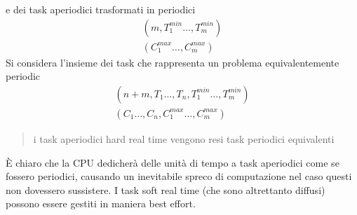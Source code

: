 \documentclass[10pt, letterpaper]{report}
\begin{document}
e dei task aperiodici trasformati in periodici
$$ \begin{matrix}(m,T_1^{min}\dots ,T_m^{min})\\
    (C_1^{max}\dots ,C_m^{max})
\end{matrix}$$
Si considera l'insieme dei task che rappresenta un problema equivalentemente periodic
$$ \begin{matrix}(n+m,T_1\dots ,T_n,T_1^{min}\dots ,T_m^{min})\\
    (C_1\dots ,C_n,C_1^{max}\dots ,C_m^{max})
\end{matrix}$$
\begin{quote}
    i task aperiodici hard real time vengono resi task periodici equivalenti
\end{quote}
È chiaro che la CPU dedicherà delle unità di tempo a task aperiodici come se fossero periodici, causando 
un inevitabile spreco di computazione nel caso questi non dovessero sussistere.\acc 
I task soft real time (che sono altrettanto diffusi) possono essere gestiti in maniera 
best effort.  
\end{document}
